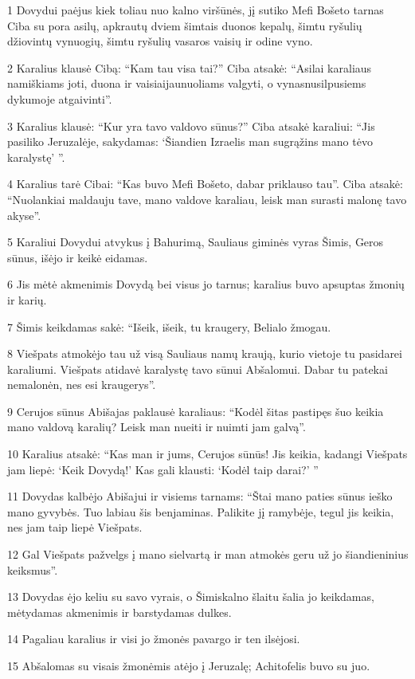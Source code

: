 \par 1 Dovydui paėjus kiek toliau nuo kalno viršūnės, jį sutiko Mefi Bošeto tarnas Ciba su pora asilų, apkrautų dviem šimtais duonos kepalų, šimtu ryšulių džiovintų vynuogių, šimtu ryšulių vasaros vaisių ir odine vyno. 
\par 2 Karalius klausė Cibą: “Kam tau visa tai?” Ciba atsakė: “Asilai­ karaliaus namiškiams joti, duona ir vaisiai­jaunuoliams valgyti, o vynas­nusilpusiems dykumoje atgaivinti”. 
\par 3 Karalius klausė: “Kur yra tavo valdovo sūnus?” Ciba atsakė karaliui: “Jis pasiliko Jeruzalėje, sakydamas: ‘Šiandien Izraelis man sugrąžins mano tėvo karalystę’ ”. 
\par 4 Karalius tarė Cibai: “Kas buvo Mefi Bošeto, dabar priklauso tau”. Ciba atsakė: “Nuolankiai maldauju tave, mano valdove karaliau, leisk man surasti malonę tavo akyse”. 
\par 5 Karaliui Dovydui atvykus į Bahurimą, Sauliaus giminės vyras Šimis, Geros sūnus, išėjo ir keikė eidamas. 
\par 6 Jis mėtė akmenimis Dovydą bei visus jo tarnus; karalius buvo apsuptas žmonių ir karių. 
\par 7 Šimis keikdamas sakė: “Išeik, išeik, tu kraugery, Belialo žmogau. 
\par 8 Viešpats atmokėjo tau už visą Sauliaus namų kraują, kurio vietoje tu pasidarei karaliumi. Viešpats atidavė karalystę tavo sūnui Abšalomui. Dabar tu patekai nemalonėn, nes esi kraugerys”. 
\par 9 Cerujos sūnus Abišajas paklausė karaliaus: “Kodėl šitas pastipęs šuo keikia mano valdovą karalių? Leisk man nueiti ir nuimti jam galvą”. 
\par 10 Karalius atsakė: “Kas man ir jums, Cerujos sūnūs! Jis keikia, kadangi Viešpats jam liepė: ‘Keik Dovydą!’ Kas gali klausti: ‘Kodėl taip darai?’ ” 
\par 11 Dovydas kalbėjo Abišajui ir visiems tarnams: “Štai mano paties sūnus ieško mano gyvybės. Tuo labiau šis benjaminas. Palikite jį ramybėje, tegul jis keikia, nes jam taip liepė Viešpats. 
\par 12 Gal Viešpats pažvelgs į mano sielvartą ir man atmokės geru už jo šiandieninius keiksmus”. 
\par 13 Dovydas ėjo keliu su savo vyrais, o Šimis­kalno šlaitu šalia jo keikdamas, mėtydamas akmenimis ir barstydamas dulkes. 
\par 14 Pagaliau karalius ir visi jo žmonės pavargo ir ten ilsėjosi. 
\par 15 Abšalomas su visais žmonėmis atėjo į Jeruzalę; Achitofelis buvo su juo. 
